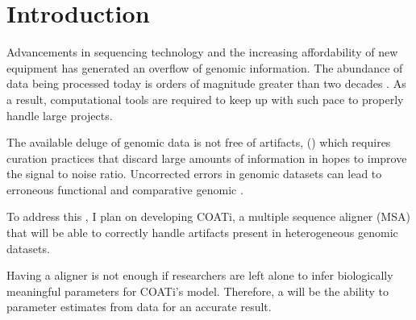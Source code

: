 \section{Introduction}


Advancements in sequencing technology and the increasing affordability of new
equipment has generated an overflow of genomic information.
The abundance of data being processed today is orders of magnitude greater than
two decades .
As a result, computational tools are required to keep up with such pace to
properly handle large projects.

The available deluge of genomic data is not free of artifacts,
()
which requires curation practices that discard large amounts of information in
hopes to improve the signal to noise ratio.
Uncorrected errors in genomic datasets can lead to erroneous functional and
comparative genomic .

To address this , I plan on developing COATi, a multiple sequence
aligner (MSA) that will be able to correctly handle artifacts present in
heterogeneous genomic datasets.

Having a  aligner is not enough if
researchers are left alone to infer biologically meaningful parameters for
COATi's model.
Therefore, a  will be the ability to  parameter
estimates from data for an accurate result.



